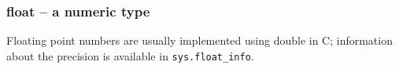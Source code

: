 \subsubsection{float -- a numeric type}
Floating point numbers are usually implemented using double in C; information about the precision is available in \texttt{sys.float_info}.